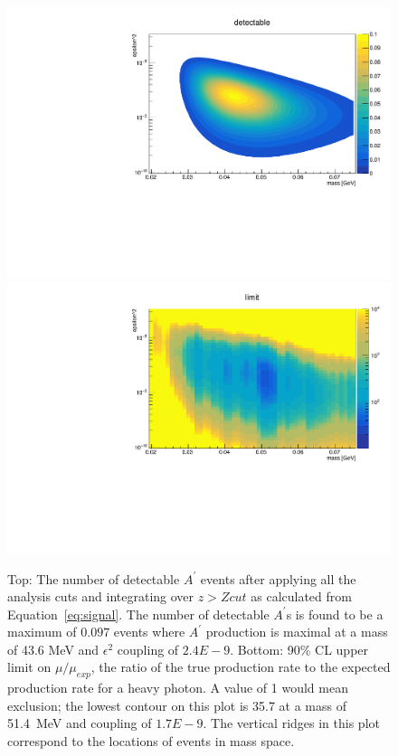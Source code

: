 \documentclass[twocolumn, showpacs, preprintnumbers,prd, superscriptaddress]{revtex4-1}
\begin{document}
        \begin{figure}[th]
            \centering
            \includegraphics[width=.9\linewidth]{figs/detectable.pdf}
            \includegraphics[width=.9\linewidth]{figs/limit.pdf}
            \caption{
                Top: The number of detectable $A^{\prime}$ events after applying all the analysis cuts and integrating over $z>Zcut$ as calculated from Equation~\eqref{eq:signal}. The number of detectable $A^{\prime}$s is found to be a maximum of $0.097$ events where $A^{\prime}$ production is maximal at a mass of 43.6 MeV and $\epsilon^2$ coupling of $2.4E-9$. Bottom: 90\% CL upper limit on $\mu/\mu_{exp}$, the ratio of the true production rate to the expected production rate for a heavy photon. A value of 1 would mean exclusion; the lowest contour on this plot is 35.7 at a mass of 51.4~MeV and coupling of $1.7E-9$. The vertical ridges in this plot correspond to the locations of events in mass space.}
            \label{fig:results}
        \end{figure}
\end{document}
